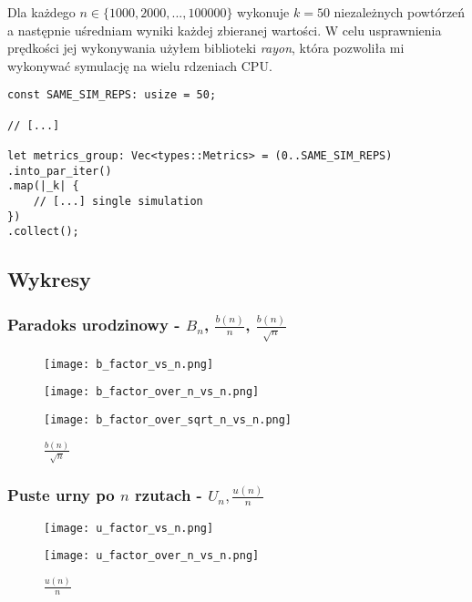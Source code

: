 \documentclass{article}
\begin{document}
Dla każdego $n\in\{1000,2000,...,100000\}$ wykonuje $k=50$ niezależnych powtórzeń a następnie uśredniam wyniki każdej zbieranej wartości. W celu usprawnienia prędkości jej wykonywania użyłem biblioteki \textit{rayon}, która pozwoliła mi wykonywać symulację na wielu rdzeniach CPU.

\begin{verbatim}
const SAME_SIM_REPS: usize = 50;

// [...]

let metrics_group: Vec<types::Metrics> = (0..SAME_SIM_REPS)
.into_par_iter()
.map(|_k| {
    // [...] single simulation
})
.collect();
\end{verbatim}

\subsection{Wykresy}

\subsubsection{Paradoks urodzinowy - $B_n$, $\frac{b(n)}{n}$, $\frac{b(n)}{\sqrt{n}}$}

\begin{figure}[H]
    \centering
    \begin{minipage}{0.24\textwidth}
        \centering
        \texttt{[image: b\_factor\_vs\_n.png]}
        \caption{$B(n)$}
    \end{minipage}
    \begin{minipage}{0.24\textwidth}
        \centering
        \texttt{[image: b\_factor\_over\_n\_vs\_n.png]}
        \caption{$\frac{b(n)}{n}$}
    \end{minipage}
    \begin{minipage}{0.24\textwidth}
        \centering
        \texttt{[image: b\_factor\_over\_sqrt\_n\_vs\_n.png]}
        \caption{$\frac{b(n)}{\sqrt{n}}$}
    \end{minipage}
\end{figure}


\subsubsection{Puste urny po $n$ rzutach - $U_n, \frac{u(n)}{n}$}

\begin{figure}[H]
    \centering
    \begin{minipage}{0.24\textwidth}
        \centering
        \texttt{[image: u\_factor\_vs\_n.png]}
        \caption{$u(n)$}
    \end{minipage}
    \begin{minipage}{0.24\textwidth}
        \centering
        \texttt{[image: u\_factor\_over\_n\_vs\_n.png]}
        \caption{$\frac{u(n)}{n}$}
    \end{minipage}
\end{figure}
\end{document}

